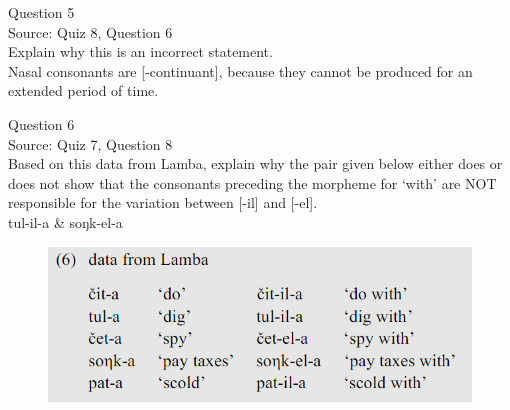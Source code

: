 \documentclass[12pt]{article}
\begin{document}
\newpage

{\large Question 5}\\

Source: Quiz 8, Question 6\\

Explain why this is an incorrect statement.\\

Nasal consonants are {[-continuant]}, because they cannot be produced for an extended period of time.


\newpage

{\large Question 6}\\

Source: Quiz 7, Question 8\\

Based on this data from Lamba, explain why the pair given below either does or does not show that the consonants preceding the morpheme for `with' are NOT responsible for the variation between [-il] and [-el].\\

tul-il-a \& soŋk-el-a

\begin{figure}[H]
\includegraphics{../images/peng119_lamba.png}
\end{figure}

\newpage

\begin{center}
\textbf{{\color{red}{\HUGE END OF EXAM}}}\\

\end{center}
\newpage

\begin{center}
\textbf{{\color{blue}{\HUGE START OF EXAM\\}}}

\textbf{{\color{blue}{\HUGE Student ID: 8742\\}}}

\textbf{{\color{blue}{\HUGE 2:00 - 2:20 PM\\}}}

\end{center}
\newpage
\end{document}
